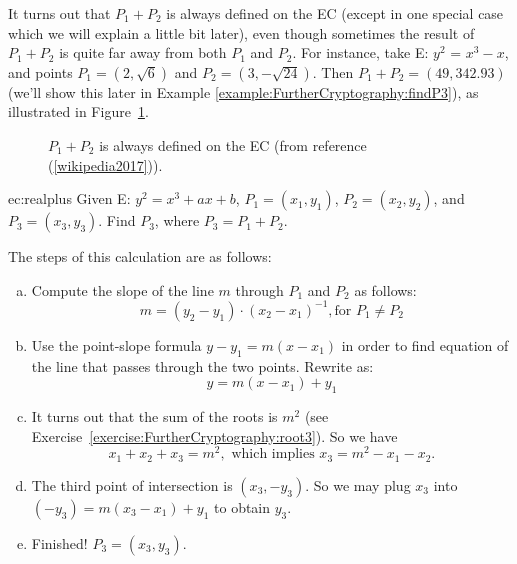 It turns out that $P_1 + P_2$ is always defined on the EC (except in one special case which we will explain a little bit later), even though sometimes the result of $P_1 + P_2$ is quite far away from both $P_1$ and $P_2$.  For instance, take E: $ y^2$ = $x^3 - x$, and points $P_1 = (2, \sqrt{6})$ and $P_2 = (3, -\sqrt{24})$.  Then $P_1 + P_2 = (49,342.93)$ (we'll show this later in Example \ref{example:FurtherCryptography:findP3}), as illustrated in Figure~\ref{fig:DH:DHKE_16}. 
\begin{figure}[htbp]
	  \caption{\label{fig:DH:DHKE_16} $P_1 + P_2$ is always defined on the EC (from reference (\ref{wikipedia2017})).}
\end{figure}

\begin{example}{ec:realplus}
Given E: $y^2 = x^3 + ax + b$, $P_1 = (x_1, y_1)$, $P_2 = (x_2, y_2)$, and $P_3 = (x_3, y_3)$. Find $P_3$, where $ P_3 =  P_1 + P_2$.

\noindent
The steps of this calculation are as follows:
\begin{enumerate}[(a)]
\item
Compute the slope of the line $m$ through $P_1$ and $P_2$ as follows:  \[ m =(y_2 - y_1) \cdot (x_2- x_1)^{-1}, \text{for } P_1 \neq P_2  \] 
\item
Use the point-slope formula $y - y_1 = m(x-x_1)$  in order to find equation of the line that passes through the two points.  Rewrite as: \[y  = m(x-x_1) + y_1\]
\item
It turns out that the sum of the roots is $m^2$ (see Exercise~\ref{exercise:FurtherCryptography:root3}). So we have
\[x_1 + x_2 + x_3 = m^2, \text{ which implies } x_3 =   m^2 -  x_1 - x_2.\]
\item  The third point of intersection is $(x_3, -y_3)$. So  we may plug $x_3$ into $(-y_3)  = m(x_3-x_1) + y_1$ to obtain $y_3$. 
\item Finished!  $P_3 = (x_3,y_3)$.
\end{enumerate}
 \end{example} 

